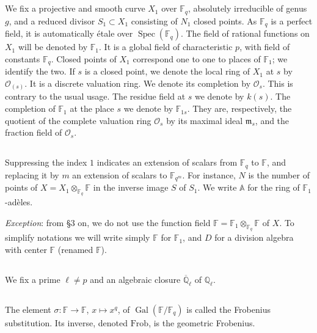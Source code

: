 \documentclass[11pt,a4paper]{article}
\theoremstyle{plain}
\theoremstyle{definition}
\DeclareMathOperator{\Spec}{Spec}
\DeclareMathOperator{\Gal}{Gal}
\newcommand{\Ql}{\overline{\mathbb{Q}}_\ell}
\newcommand{\Fq}{\mathbb{F}_q}
\newcommand{\F}{\mathbb{F}}
\newcommand{\Q}{\mathbb{Q}}
\newcommand{\Frob}{\mathrm{Frob}}
\begin{document}
\subsection{}
We fix a projective and smooth curve $X_1$ over $\Fq$, absolutely irreducible of genus $g$, and a reduced divisor $S_1 \subset X_1$ consisting of $N_1$ closed points. As $\Fq$ is a perfect field, it is automatically \'etale over $\Spec(\Fq)$. The field of rational functions on $X_1$ will be denoted by $\mathbb{F}_1$. It is a global field of characteristic $p$, with field of constants $\Fq$. Closed points of $X_1$ correspond one to one to places of $\mathbb{F}_1$; we identify the two. If $s$ is a closed point, we denote the local ring of $X_1$ at $s$ by $\mathcal{O}_{(s)}$. It is a discrete valuation ring. We denote its completion by $\mathcal{O}_s$. This is contrary to the usual usage. The residue field at $s$ we denote by $k(s)$. The completion of $\mathbb{F}_1$ at the place $s$ we denote by $\mathbb{F}_{1s}$. They are, respectively, the quotient of the complete valuation ring $\mathcal{O}_s$ by its maximal ideal $\mathfrak{m}_s$, and the fraction field of $\mathcal{O}_s$.

\subsection{}
Suppressing the index $1$ indicates an extension of scalars from $\Fq$ to $\F$, and replacing it by $m$ an extension of scalars to $\F_{q^m}$. For instance, $N$ is the number of points of $X = X_1 \otimes_{\Fq} \F$ in the inverse image $S$ of $S_1$. We write $\mathbb{A}$ for the ring of $\mathbb{F}_1$-ad\`eles.

\textit{Exception}: from \S 3 on, we do not use the function field $\mathbb{F} = \mathbb{F}_1 \otimes_{\Fq} \F$ of $X$. To simplify notations we will write simply $\mathbb{F}$ for $\mathbb{F}_1$, and $D$ for a division algebra with center $\mathbb{F}$ (renamed $\mathbb{F}$).

\subsection{}
We fix a prime $\ell \neq p$ and an algebraic closure $\Ql$ of $\Q_\ell$.

\subsection{}
The element $\sigma: \F \to \F$, $x \mapsto x^q$, of $\Gal(\F/\Fq)$ is called the Frobenius substitution. Its inverse, denoted $\Frob$, is the geometric Frobenius.
\end{document}
